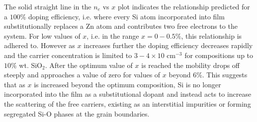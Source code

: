 \documentclass[final,5p,times]{elsarticle}
\begin{document}
The solid straight line in the $n_e$ vs $x$ plot indicates the relationship predicted for  a $100\%$ doping efficiency, i.e. where every Si atom incorporated into film substitutionally replaces a Zn atom and contributes two free electrons to the system. For low values of $x$, i.e. in the range $x=0 - 0.5\%$, this relationship is adhered to. However as $x$ increases further the doping efficiency decreases rapidly and the carrier concentration is limited to $3-4\times10$ cm$^{-3}$ for compositions up to $10\%$ wt. SiO$_{2}$. After the optimum value of $x$ is reached the mobility drops off steeply and approaches a value of zero for values of $x$ beyond $6\%$. This suggests that as $x$ is increased beyond the optimum composition, Si is no longer incorporated into the film as a substitutional dopant and instead acts to increase the scattering of the free carriers, existing as an interstitial impurities or forming segregated Si-O phases at the grain boundaries. 
\end{document}
